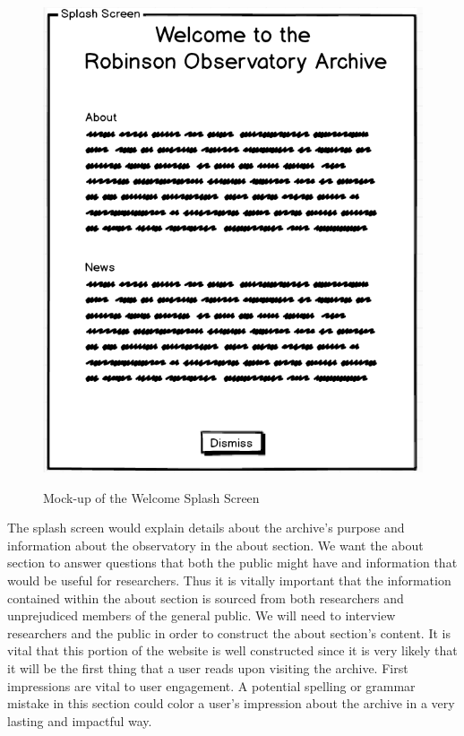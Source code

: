 \documentclass[12pt]{report}
\begin{document}
\begin{figure}[h]
	\centering
	\caption{Mock-up of the Welcome Splash Screen}
	\includegraphics[scale=0.33]{splash_screen_mockup}
	\label{fig:splashscreenmockup}
\end{figure}

The splash screen would explain details about the archive's purpose and information about the observatory in the about section. We want the about section to answer questions that both the public might have and information that would be useful for researchers. Thus it is vitally important that the information contained within the about section is sourced from both researchers and unprejudiced members of the general public. We will need to interview researchers and the public in order to construct the about section's content. It is vital that this portion of the website is well constructed since it is very likely that it will be the first thing that a user reads upon visiting the archive. First impressions are vital to user engagement. A potential spelling or grammar mistake in this section could color a user's impression about the archive in a very lasting and impactful way.
\end{document}
